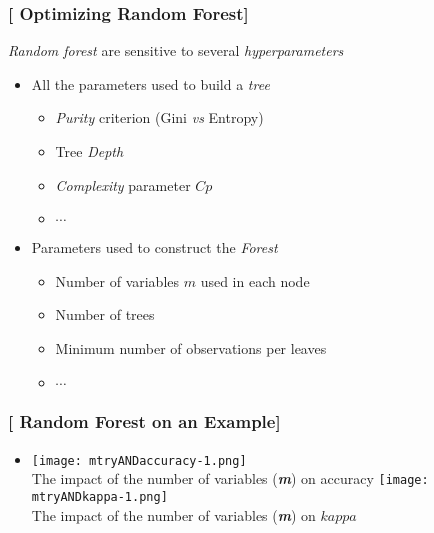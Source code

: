 \documentclass[xcolor=x11names,compress, handhouts]{beamer}
\renewcommand{\(}{\begin{columns}}
\renewcommand{\)}{\end{columns}}
\newcommand{\<}[1]{\begin{column}{#1}}
\renewcommand{\>}{\end{column}}
\begin{document}
\begin{frame}
\frametitle{\textcolor{brique}{[ Optimizing Random Forest]}}
\textit{Random forest} are sensitive to several \textit{hyperparameters}
\pause
\begin{itemize}[<+->]
    \item All the parameters used to build a \textit{tree}
    \begin{itemize}[<+->]
        \item \textit{Purity} criterion (Gini \textit{vs} Entropy)
        \item Tree \textit{Depth}
        \item \textit{Complexity} parameter $Cp$
        \item $\cdots$
    \end{itemize}
    \item Parameters used to construct the \textit{Forest}
    \begin{itemize}[<+->]
        \item Number of variables $m$  used in each node
        \item Number of trees
        \item Minimum number of observations per leaves
        \item $\cdots$
    \end{itemize}
\end{itemize}
\end{frame}


\begin{frame}
\frametitle{\textcolor{brique}{[ Random Forest on an Example]}}
\pause
\begin{itemize}
\item[]
    {\texttt{[image: mtryANDaccuracy-1.png]}\\  }
    {The impact of the number of variables (\textbf{\textit{m}}) on accuracy}
    {\texttt{[image: mtryANDkappa-1.png]}\\ }
    {The impact of the number of variables (\textbf{\textit{m}}) on $kappa$ }
\end{itemize}
\end{frame}
\end{document}
